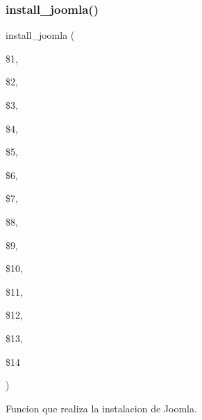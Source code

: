 \subsubsection{\texorpdfstring{install\+\_\+joomla()}{install\_joomla()}}
{\footnotesize\ttfamily install\+\_\+joomla (\begin{DoxyParamCaption}\item[{}]{\$1,  }\item[{}]{\$2,  }\item[{}]{\$3,  }\item[{}]{\$4,  }\item[{}]{\$5,  }\item[{}]{\$6,  }\item[{}]{\$7,  }\item[{}]{\$8,  }\item[{}]{\$9,  }\item[{}]{\$10,  }\item[{}]{\$11,  }\item[{}]{\$12,  }\item[{}]{\$13,  }\item[{}]{\$14 }\end{DoxyParamCaption})}



Funcion que realiza la instalacion de Joomla. 



